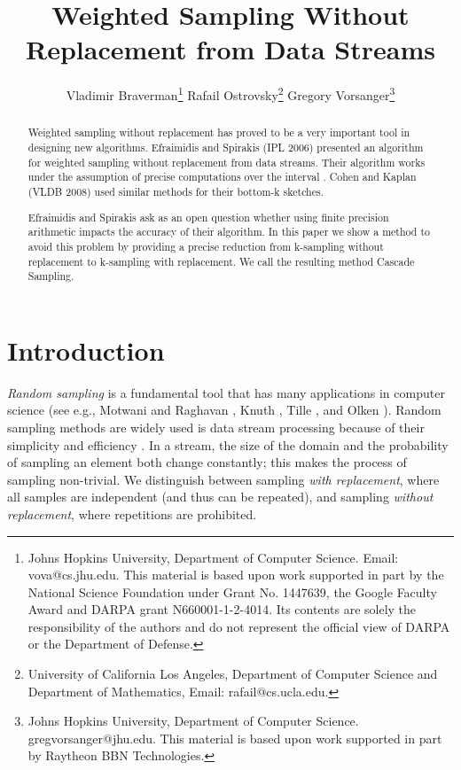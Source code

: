 \documentclass{llncs}
\begin{document}
\title{Weighted Sampling Without Replacement from Data Streams}

\author{Vladimir Braverman\thanks{Johns Hopkins University, Department of Computer Science. Email: vova@cs.jhu.edu. This material is based upon work supported in part by the National Science Foundation under Grant No. 1447639, the Google Faculty Award and DARPA grant N660001-1-2-4014. Its contents are solely the responsibility of the authors and do not represent the official view of DARPA or the Department of Defense.} Rafail Ostrovsky\thanks{University of California Los Angeles, Department of Computer Science and Department
of Mathematics, Email: rafail@cs.ucla.edu. } Gregory Vorsanger\thanks{Johns Hopkins University, Department of Computer Science. gregvorsanger@jhu.edu. This material is based upon work supported in part by Raytheon BBN Technologies.}}

\institute{}

\maketitle






\begin{abstract}

Weighted sampling without replacement has proved to be a very important tool in designing new algorithms.
Efraimidis and Spirakis (IPL 2006) presented an algorithm for weighted sampling
without replacement from data streams.
Their algorithm works under the assumption of precise computations over the interval .
Cohen and Kaplan (VLDB 2008) used similar methods for their bottom-k
sketches.

Efraimidis and Spirakis ask as an open question whether using finite precision arithmetic impacts the accuracy of their algorithm. In this paper we show a method to avoid this problem by providing a precise reduction from k-sampling without replacement to k-sampling with replacement. We call the resulting method Cascade Sampling.
\end{abstract}

\section{Introduction}


\emph{Random sampling} is a fundamental tool that has many applications in
computer science (see e.g., Motwani and Raghavan \cite{randomized}, Knuth \cite{knuth}, Tille \cite{tille}, and Olken \cite{olken}). Random sampling methods are widely used is data stream processing
because of their simplicity and efficiency \cite{dlt,stream_operator,mg,dynamic,reservoir2,reservoir1}. In a stream, the size of the domain and the probability of sampling an element both change constantly; this makes the process of sampling non-trivial. We distinguish between
sampling \emph{with replacement}, where all samples are independent
(and thus can be repeated), and sampling
\emph{without replacement}, where repetitions are prohibited.
\end{document}
